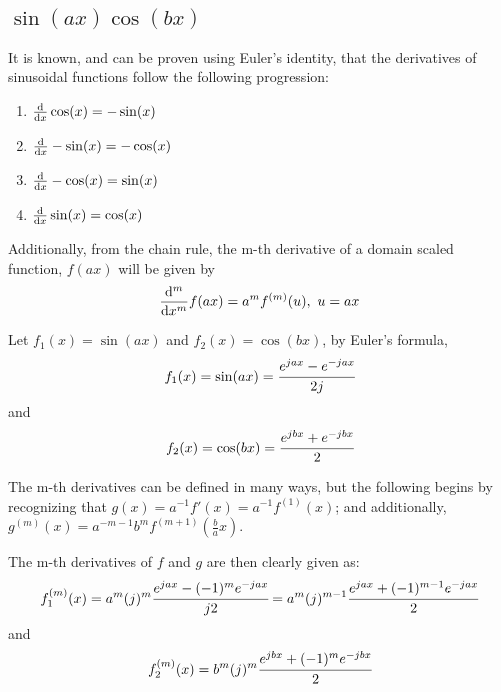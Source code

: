 \documentclass[]{article}
\begin{document}
\subsection{
    $\sin(ax)\cos(bx)$
}
It is known, and can be proven using Euler's identity, that the derivatives of sinusoidal functions follow the following progression:
    \begin{enumerate}
        \item $\dv{x} \cos(x) = - \sin(x)$
        \item $\dv{x} -\sin(x) = - \cos(x)$
        \item $\dv{x} -\cos(x) = \sin(x)$
        \item $\dv{x} \sin(x) = \cos(x)$
    \end{enumerate}
Additionally, from the chain rule, the m-th derivative of a domain scaled function, $f(a x)$ will be given by
\[
    \dv[m]{x} f(a x) = a^{m} f^{(m)}(u), \ u = a x
\]

Let $f_1(x) = \sin(ax)$ and $f_2(x) = \cos(bx)$, by Euler's formula,
\[
    f_1(x) = \sin(ax) = \cfrac{e^{j a x} - e^{- j a x}}{2 j}
\]
and
\[
    f_2(x) = \cos(bx) = \cfrac{e^{j b x} + e^{-j b x}}{2}
\]

The m-th derivatives can be defined in many ways, but the following begins by recognizing that $g(x) = a^{-1} f'(x) = a^{-1} f^{(1)}(x)$; and additionally, $g^{(m)}(x) = a^{-m - 1} b^{m} f^{(m + 1)}(\frac{b}{a}x)$.


The m-th derivatives of $f$ and $g$ are then clearly given as:
\[
    f_1^{(m)}(x) 
    = a^m (j)^{m} \cfrac{e^{j a x} - (-1)^{m} e^{- j a x}}{j 2}
    = a^m (j)^{m - 1} \cfrac{e^{j a x} + (-1)^{m - 1} e^{- j a x}}{2}
\]
and 
\[
    f_2^{(m)}(x) 
    = b^m (j)^{m} \cfrac{e^{j b x} + (-1)^{m} e^{- j b x}}{2}
\]
\end{document}
